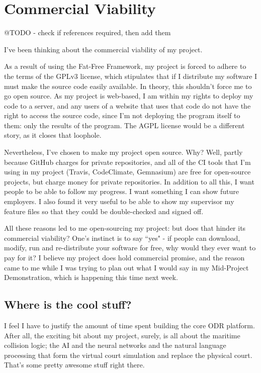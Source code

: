 \chapter{Commercial Viability} \label{appendix:commercialViability}

@TODO - check if references required, then add them

I've been thinking about the commercial viability of my project.

As a result of using the Fat-Free Framework, my project is forced to adhere to the terms of the GPLv3 license, which stipulates that if I distribute my software I must make the source code easily available. In theory, this shouldn't force me to go open source. As my project is web-based, I am within my rights to deploy my code to a server, and any users of a website that uses that code do not have the right to access the source code, since I'm not deploying the program itself to them: only the results of the program. The AGPL license would be a different story, as it closes that loophole.

Nevertheless, I've chosen to make my project open source. Why? Well, partly because GitHub charges for private repositories, and all of the CI tools that I'm using in my project (Travis, CodeClimate, Gemnasium) are free for open-source projects, but charge money for private repositories. In addition to all this, I want people to be able to follow my progress. I want something I can show future employers. I also found it very useful to be able to show my supervisor my feature files so that they could be double-checked and signed off.

All these reasons led to me open-sourcing my project: but does that hinder its commercial viability? One's instinct is to say ``yes" - if people can download, modify, run and re-distribute your software for free, why would they ever want to pay for it? I believe my project does hold commercial promise, and the reason came to me while I was trying to plan out what I would say in my Mid-Project Demonstration, which is happening this time next week.

\section{Where is the cool stuff?}

I feel I have to justify the amount of time spent building the core ODR platform. After all, the exciting bit about my project, surely, is all about the maritime collision logic; the AI and the neural networks and the natural language processing that form the virtual court simulation and replace the physical court. That's some pretty awesome stuff right there.

